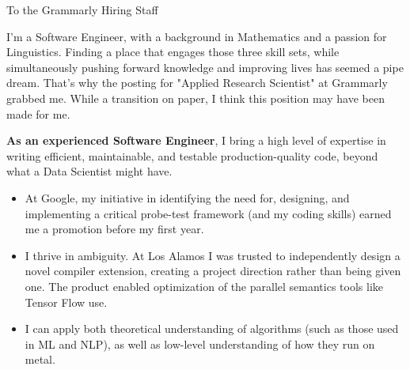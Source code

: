 \documentclass[sans, a4paper]{article}
\newcommand{\cvcolor}[1]{{\color{MidnightBlue}#1}}
\renewcommand{\hl}[1]{\cvcolor{\textbf{#1}}}
\begin{document}
\begin{adjustwidth}{40pt}{40pt}

  To the Grammarly Hiring Staff \par \bigskip

  I'm a Software Engineer, with a background in Mathematics and a passion for
  Linguistics. Finding a place that engages those three skill sets, while
  simultaneously pushing forward knowledge and improving lives has seemed a
  pipe dream. That's why the posting for "Applied Research Scientist" at
  Grammarly grabbed me. While a transition on paper, I think this position may
  have been made for me. \medskip


  \hl{As an experienced Software Engineer}, I bring a high level of expertise
  in writing efficient, maintainable, and testable production-quality code,
  beyond what a Data Scientist might have.

  \begin{itemize}
    \item At Google, my initiative in identifying the need for, designing, and
      implementing a critical probe-test framework (and my coding skills)
      earned me a promotion before my first year.
    \item I thrive in ambiguity. At Los Alamos I was trusted to independently
      design a novel compiler extension, creating a project direction rather
      than being given one. The product enabled optimization of the parallel
      semantics tools like Tensor Flow use.
    \item I can apply both theoretical understanding of algorithms (such as
      those used in ML and NLP), as well as low-level understanding of how they
      run on metal.

  \end{itemize} \medskip


\end{adjustwidth}
\end{document}
